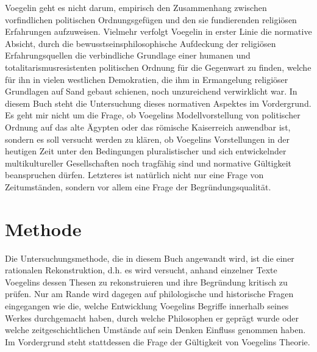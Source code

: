 Voegelin geht es nicht darum, empirisch den Zusammenhang zwischen
vorfindlichen politischen Ordnungsgefügen und den sie fundierenden religiösen
Erfahrungen aufzuweisen. Vielmehr verfolgt Voegelin in erster Linie die
normative Absicht, durch die bewusstseinsphilosophische Aufdeckung der
religiösen Erfahrungsquellen die verbindliche Grundlage einer humanen und
totalitarismusresistenten politischen Ordnung für die Gegenwart zu finden,
welche für ihn in vielen westlichen Demokratien, die ihm in Ermangelung
religiöser Grundlagen auf Sand gebaut schienen, noch unzureichend verwirklicht
war. In diesem Buch steht die Untersuchung dieses normativen Aspektes im
Vordergrund. Es geht mir nicht um die Frage, ob Voegelins Modellvorstellung
von politischer Ordnung auf das alte Ägypten oder das römische Kaiserreich
anwendbar ist, sondern es soll versucht werden zu klären, ob Voegelins
Vorstellungen in der heutigen Zeit unter den Bedingungen pluralistischer und
sich entwickelnder multikultureller Gesellschaften noch tragfähig sind und
normative Gültigkeit beanspruchen dürfen. Letzteres ist natürlich nicht nur
eine Frage von Zeitumständen, sondern vor allem eine Frage der
Begründungsqualität.

\section{Methode}

Die Untersuchungsmethode, die in diesem Buch angewandt wird, ist die einer
rationalen Rekonstruktion, d.h. es wird versucht, anhand einzelner Texte
Voegelins dessen Thesen zu rekonstruieren und ihre Begründung kritisch zu
prüfen. Nur am Rande wird dagegen auf philologische und historische Fragen
eingegangen wie die, welche Entwicklung Voegelins Begriffe innerhalb seines
Werkes durchgemacht haben, durch welche Philosophen er geprägt wurde oder
welche zeitgeschichtlichen Umstände auf sein Denken Einfluss genommen haben. Im
Vordergrund steht stattdessen die Frage der Gültigkeit von Voegelins
Theorie.



